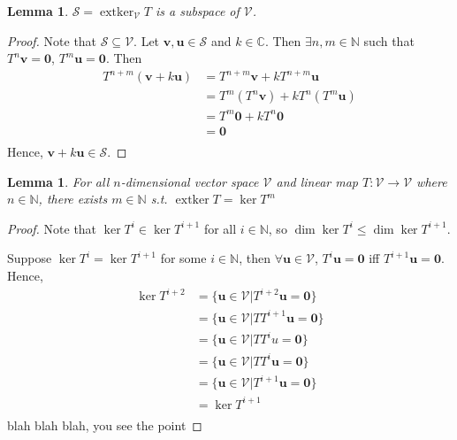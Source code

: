 \documentclass{article}
\theoremstyle{plain}
\newtheorem{lemma}[theorem]{Lemma}
\theoremstyle{definition}
\newcommand{\0}{\mathbf{0}}
\renewcommand{\vec}{\mathbf}
\newcommand{\C}{\mathbb{C}}
\newcommand{\N}{\mathbb{N}}
\newcommand{\vecspace}[1]{\mathcal{#1}}
\DeclareMathOperator{\extker}{extker}
\begin{document}
\begin{lemma}
    \label{lemma:extker_is_subspace}
    $\vecspace{S} = \extker_\vecspace{V} T$ is a subspace of $\vecspace{V}$.
\end{lemma}
\begin{proof}
    Note that $\vecspace{S} \subseteq \vecspace{V}$.
    Let $\vec{v}, \vec{u} \in \vecspace{S}$ and $k \in \C$. Then $\exists n,m \in \N$ such that $T^{n}\vec{v}=\0$, $T^{m}\vec{u}=\0$.
    Then
    \begin{align*}
        T^{n+m}(\vec{v}+k\vec{u})
        &=T^{n+m}\vec{v}+kT^{n+m}\vec{u}\\
        &=T^m(T^n\vec{v})+kT^n(T^m\vec{u})\\
        &=T^m\0+kT^n\0\\
        &=\0\\
    \end{align*}
    Hence, $\vec{v}+k\vec{u} \in \vecspace{S}$.
\end{proof}

\begin{lemma}
    \label{lemma:ext_finite_power}
    For all $n$-dimensional vector space $\vecspace{V}$ and linear map $T: \vecspace{V} \to \vecspace{V}$ where $n\in\N$, there exists $m\in\N$ s.t. $\extker T = \ker T^m$
\end{lemma}
\begin{proof}
    Note that $\ker T^i\in\ker T^{i+1}$ for all $i\in\N$, so $\dim\ker T^i\le\dim\ker T^{i+1}$.

    Suppose $\ker T^i = \ker T^{i+1}$ for some $i\in\N$, then $\forall \vec{u}\in\vecspace{V}$, $T^i\vec{u}=\0$ iff $T^{i+1}\vec{u}=\0$.
    Hence,
    \begin{align*}
        \ker T^{i+2}
        &= \{\vec{u}\in\vecspace{V}|T^{i+2}\vec{u}=\0\}\\
        &= \{\vec{u}\in\vecspace{V}|TT^{i+1}\vec{u}=\0\}\\
        &= \{\vec{u}\in\vecspace{V}|TT^iu\vec{=}\0\}\\
        &= \{\vec{u}\in\vecspace{V}|TT^i\vec{u}=\0\}\\
        &= \{\vec{u}\in\vecspace{V}|T^{i+1}\vec{u}=\0\}\\
        &= \ker T^{i+1}\\
    \end{align*}
    blah blah blah, you see the point
\end{proof}
\end{document}
